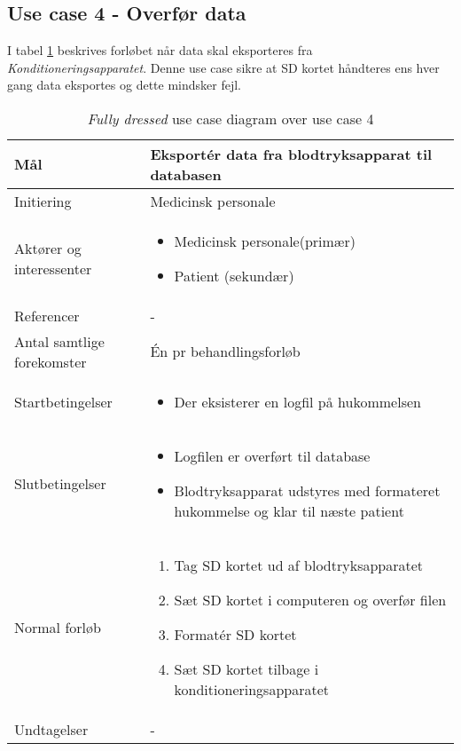 	\subsection{Use case 4 - Overfør data}
	I tabel \ref{tab:uc4} beskrives forløbet når data skal eksporteres fra \textit{Konditioneringsapparatet}. Denne use case sikre at SD kortet håndteres ens hver gang data eksportes og dette mindsker fejl. 
	\begin{table}[H]
		\begin{center}
			\begin{tabular}{ | p{} | p{}| } 
				\hline
				Mål & Eksportér data fra blodtryksapparat til databasen\\ 
				\hline
				Initiering &  Medicinsk personale\\
				\hline
				Aktører og interessenter & 
				\begin{itemize}
					\item Medicinsk personale(primær)
					\item Patient (sekundær)
				\end{itemize} \\ 
				\hline
				Referencer & - \\ 
				\hline
				Antal samtlige forekomster & Én pr behandlingsforløb \\ 
				\hline	
				Startbetingelser & 
				\begin{itemize}
					\item Der eksisterer en logfil på hukommelsen
				\end{itemize} \\ 
				\hline
				Slutbetingelser & 
				\begin{itemize}
					\item Logfilen er overført til database
					\item Blodtryksapparat udstyres med formateret hukommelse og klar til næste patient
				\end{itemize} \\ 
				\hline
				Normal forløb & \begin{enumerate}
					\setlength\itemsep{0cm} %
					\item Tag SD kortet ud af blodtryksapparatet 
					\item Sæt SD kortet i computeren og overfør filen 
					\item Formatér SD kortet
					\item Sæt SD kortet tilbage i konditioneringsapparatet 
				\end{enumerate} \\ 
				\hline
				Undtagelser & -\\ 
				\hline
			\end{tabular}
		\end{center}
		
			\caption{\textit{Fully dressed} use case diagram over use case 4} \label{tab:uc4}
		\end{table}
			\newpage